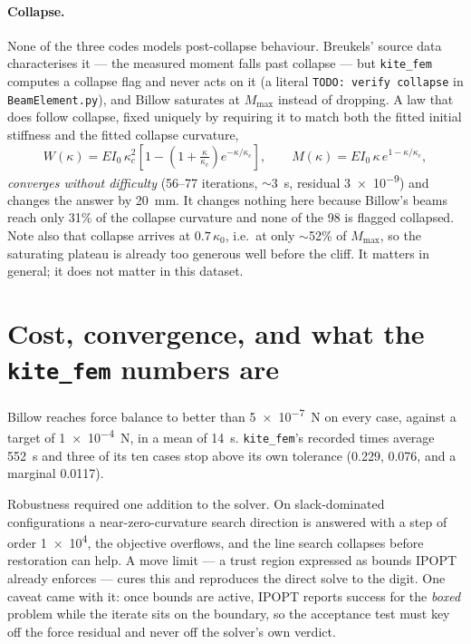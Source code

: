 \documentclass[11pt,a4paper]{article}
\begin{document}
\paragraph{Collapse.} None of the three codes models post-collapse behaviour.
Breukels' source data characterises it --- the measured moment falls past
collapse --- but \texttt{kite\_fem} computes a collapse flag and never acts on
it (a literal \texttt{TODO: verify collapse} in \texttt{BeamElement.py}), and
Billow saturates at $M_\text{max}$ instead of dropping. A law that does follow
collapse, fixed uniquely by requiring it to match both the fitted initial
stiffness and the fitted collapse curvature,
\begin{equation}
W(\kappa) = EI_0\,\kappa_c^{2}
\left[1-\left(1+\tfrac{\kappa}{\kappa_c}\right)e^{-\kappa/\kappa_c}\right],
\qquad
M(\kappa) = EI_0\,\kappa\,e^{1-\kappa/\kappa_c},
\end{equation}
\emph{converges without difficulty} (56--77 iterations, $\sim$\SI{3}{s},
residual \num{3e-9}) and changes the answer by \SI{20}{mm}. It changes nothing
here because Billow's beams reach only 31\% of the collapse curvature and none
of the 98 is flagged collapsed. Note also that collapse arrives at
$0.7\,\kappa_0$, i.e.\ at only $\sim$52\% of $M_\text{max}$, so the saturating
plateau is already too generous well before the cliff. It matters in general;
it does not matter in this dataset.

\section{Cost, convergence, and what the \texttt{kite\_fem} numbers are}

\begin{table}[htbp]
\centering
\caption{Solver cost. $^{\ast}$ marks cases that never reached
\texttt{kite\_fem}'s own \num{0.01} tolerance. \textbf{The two time columns were
measured on different machines} and are not a controlled benchmark --- see the
caveats below.}

\end{table}

Billow reaches force balance to better than \SI{5e-7}{N} on every case, against
a target of \SI{1e-4}{N}, in a mean of \SI{14}{s}. \texttt{kite\_fem}'s recorded
times average \SI{552}{s} and three of its ten cases stop above its own
tolerance (\num{0.229}, \num{0.076}, and a marginal \num{0.0117}).

Robustness required one addition to the solver. On slack-dominated
configurations a near-zero-curvature search direction is answered with a step of
order \num{1e4}, the objective overflows, and the line search collapses before
restoration can help. A move limit --- a trust region expressed as bounds IPOPT
already enforces --- cures this and reproduces the direct solve to the digit.
One caveat came with it: once bounds are active, IPOPT reports success for the
\emph{boxed} problem while the iterate sits on the boundary, so the acceptance
test must key off the force residual and never off the solver's own verdict.
\end{document}
